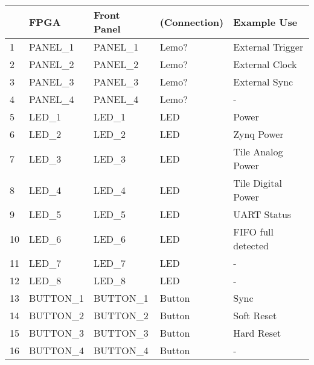 \documentclass[12pt]{article}
\begin{document}
\begin{tabular}{|ll|l|l|l|}
\hline
   & FPGA        & Front Panel & (Connection) & Example Use  \\  
\hline
1  & PANEL\_1     & PANEL\_1     & Lemo?      & External Trigger \\
\hline
2  & PANEL\_2     & PANEL\_2     & Lemo?      & External Clock \\
\hline
3  & PANEL\_3     & PANEL\_3     & Lemo?      & External Sync \\
\hline
4  & PANEL\_4     & PANEL\_4     & Lemo?      & - \\
\hline
5  & LED\_1       & LED\_1       & LED        & Power \\
\hline
6  & LED\_2       & LED\_2       & LED        & Zynq Power \\
\hline
7  & LED\_3       & LED\_3       & LED        & Tile Analog Power \\
\hline
8  & LED\_4       & LED\_4       & LED        & Tile Digital Power \\
\hline
9  & LED\_5       & LED\_5       & LED        & UART Status \\
\hline
10  & LED\_6       & LED\_6       & LED        & FIFO full detected \\
\hline
11  & LED\_7       & LED\_7       & LED        & - \\
\hline
12  & LED\_8       & LED\_8       & LED        & - \\
\hline
13 & BUTTON\_1    & BUTTON\_1    & Button     & Sync \\
\hline
14  & BUTTON\_2    & BUTTON\_2    & Button     & Soft Reset \\
\hline
15  & BUTTON\_3    & BUTTON\_3    & Button     & Hard Reset \\
\hline
16  & BUTTON\_4    & BUTTON\_4    & Button     & - \\
\hline
\end{tabular}
 
\end{document}
